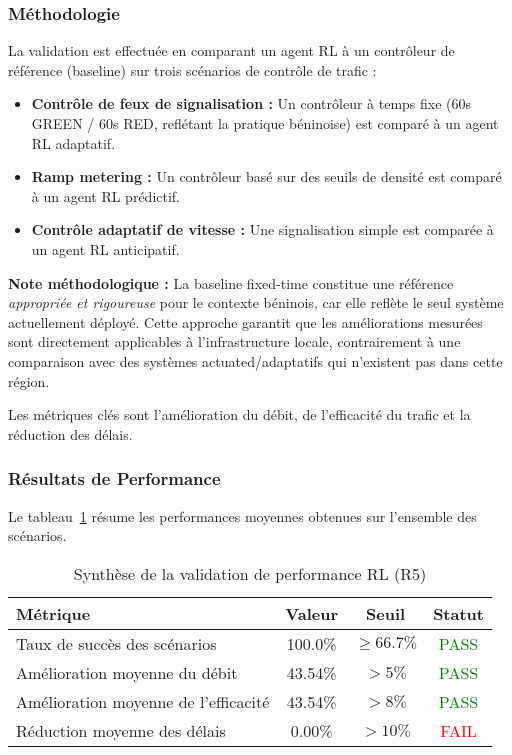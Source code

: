 \subsubsection{Méthodologie}
La validation est effectuée en comparant un agent RL à un contrôleur de référence (baseline) sur trois scénarios de contrôle de trafic :
\begin{itemize}
    \item \textbf{Contrôle de feux de signalisation :} Un contrôleur à temps fixe (60s GREEN / 60s RED, reflétant la pratique béninoise) est comparé à un agent RL adaptatif.
    \item \textbf{Ramp metering :} Un contrôleur basé sur des seuils de densité est comparé à un agent RL prédictif.
    \item \textbf{Contrôle adaptatif de vitesse :} Une signalisation simple est comparée à un agent RL anticipatif.
\end{itemize}

\textbf{Note méthodologique :} La baseline fixed-time constitue une référence \textit{appropriée et rigoureuse} pour le contexte béninois, car elle reflète le seul système actuellement déployé. Cette approche garantit que les améliorations mesurées sont directement applicables à l'infrastructure locale, contrairement à une comparaison avec des systèmes actuated/adaptatifs qui n'existent pas dans cette région.

Les métriques clés sont l'amélioration du débit, de l'efficacité du trafic et la réduction des délais.

\subsubsection{Résultats de Performance}

Le tableau~\ref{tab:rl_performance_summary_76} résume les performances moyennes obtenues sur l'ensemble des scénarios.

\begin{table}[h!]
\centering
\caption{Synthèse de la validation de performance RL (R5)}
\label{tab:rl_performance_summary_76}
\begin{tabular}{|l|c|c|c|}
\hline
\textbf{Métrique} & \textbf{Valeur} & \textbf{Seuil} & \textbf{Statut} \\
\hline
Taux de succès des scénarios & 100.0\% & $\geq 66.7\%$ & \textcolor{green}{PASS} \\
Amélioration moyenne du débit & 43.54\% & $> 5\%$ & \textcolor{green}{PASS} \\
Amélioration moyenne de l'efficacité & 43.54\% & $> 8\%$ & \textcolor{green}{PASS} \\
Réduction moyenne des délais & 0.00\% & $> 10\%$ & \textcolor{red}{FAIL} \\
\hline
\end{tabular}
\end{table}

